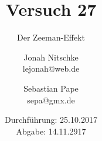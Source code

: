 

\title{Versuch 27}
\subtitle{Der Zeeman-Effekt}
\author{Jonah Nitschke\\
        lejonah@web.de \and
        Sebastian Pape\\
        sepa@gmx.de}
\date{Durchführung: 25.10.2017\\
      Abgabe: 14.11.2917}



\maketitle
\newpage
\setcounter{page}{1}


\newpage


\printbibliography


